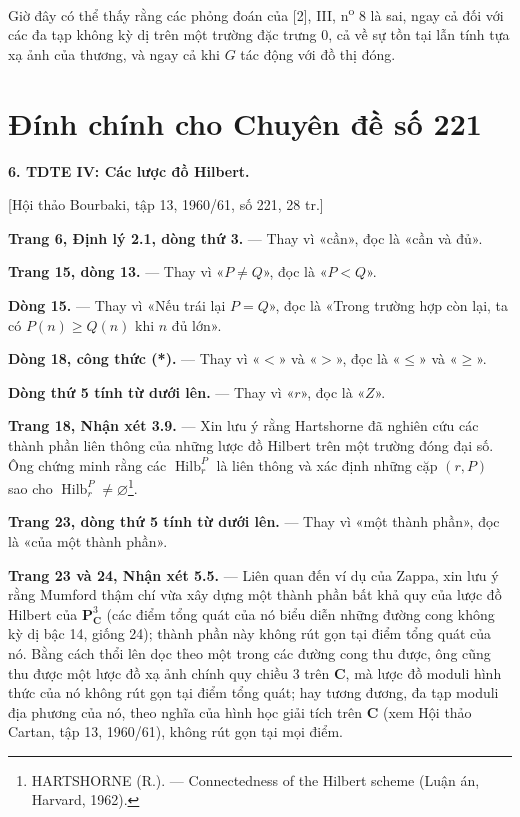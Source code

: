 \documentclass[11pt,twoside,openany]{book}
\numberwithin{equation}{section}
\newcommand{\src}[1]{%
  \phantomsection\hypertarget{src:\fgasourceid:#1}{}%
  \marginpar{\raggedleft\footnotesize\sffamily #1}%
}
\newcommand{\fgasourceid}{unset}
\newcommand{\sid}[1]{\gdef\fgasourceid{#1}\phantomsection\hypertarget{fga:#1}{}}
\begin{document}
Giờ đây có thể thấy rằng các phỏng đoán của [2], III,
n\textsuperscript{o} 8 là sai, ngay cả đối với các đa tạp không kỳ dị trên một
trường đặc trưng 0, cả về sự tồn tại lẫn tính tựa xạ ảnh của thương, và ngay cả
khi $G$ tác động với đồ thị đóng.

\par

\clearpage
\chapter*{Đính chính cho Chuyên đề số 221}
\setcounter{footnote}{3}
\sid{e221}
\src{302}

\noindent\textbf{6. TDTE IV: Các lược đồ Hilbert.}

\begin{center}
[Hội thảo Bourbaki, tập 13, 1960/61, số 221, 28 tr.]
\end{center}

\noindent\textbf{Trang 6, Định lý 2.1, dòng thứ 3.} --- Thay vì
«cần», đọc là «cần và đủ».

\noindent\textbf{Trang 15, dòng 13.} --- Thay vì «$P\neq Q$», đọc là
«$P<Q$».

\noindent\textbf{Dòng 15.} --- Thay vì «Nếu trái lại $P=Q$», đọc là
«Trong trường hợp còn lại, ta có $P(n)\geq Q(n)$ khi $n$ đủ lớn».

\noindent\textbf{Dòng 18, công thức (*).} --- Thay vì «$<$» và «$>$»,
đọc là «$\leq$» và «$\geq$».

\noindent\textbf{Dòng thứ 5 tính từ dưới lên.} --- Thay vì «$r$», đọc là
«$Z$».

\noindent\textbf{Trang 18, Nhận xét 3.9.} --- Xin lưu ý rằng Hartshorne đã
nghiên cứu các thành phần liên thông của những lược đồ Hilbert trên một trường
đóng đại số. Ông chứng minh rằng các $\operatorname{Hilb}^{P}_{r}$ là liên
thông và xác định những cặp $(r,P)$ sao cho
$\operatorname{Hilb}^{P}_{r}\neq\varnothing$\footnote{HARTSHORNE
(R.). --- Connectedness of the Hilbert scheme (Luận án, Harvard, 1962).}.

\noindent\textbf{Trang 23, dòng thứ 5 tính từ dưới lên.} --- Thay vì «một
thành phần», đọc là «của một thành phần».

\noindent\textbf{Trang 23 và 24, Nhận xét 5.5.} --- Liên quan đến ví dụ của
Zappa, xin lưu ý rằng Mumford thậm chí vừa xây dựng một thành phần bất khả quy
của lược đồ Hilbert của $\mathbf P^3_{\mathbf C}$ (các điểm tổng quát của nó
biểu diễn những đường cong không kỳ dị bậc 14, giống 24); thành phần này không
rút gọn tại điểm tổng quát của nó. Bằng cách thổi lên dọc theo một trong các
đường cong thu được, ông cũng thu được một lược đồ xạ ảnh chính quy chiều 3
trên $\mathbf C$, mà lược đồ moduli hình thức của nó không rút gọn tại điểm
tổng quát; hay tương đương, đa tạp moduli địa phương của nó, theo nghĩa của
hình học giải tích trên $\mathbf C$ (xem Hội thảo Cartan, tập 13, 1960/61),
không rút gọn tại mọi điểm.
\end{document}
